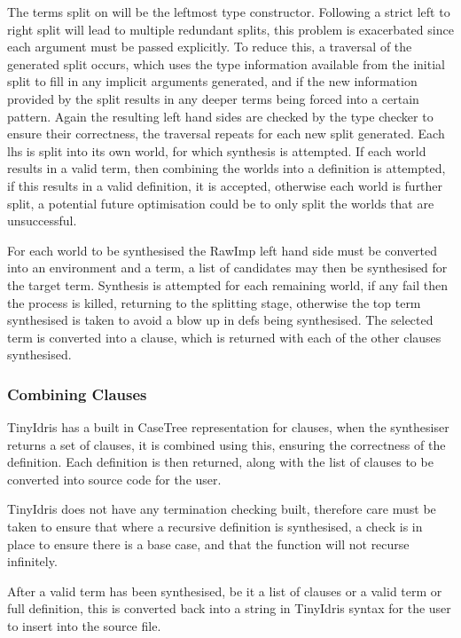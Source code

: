 \documentclass[a4paper]{article}
\begin{document}
The terms split on will be the leftmost type constructor. Following a strict 
left to right split will lead to multiple redundant splits, this problem is 
exacerbated since each argument must be passed explicitly. To reduce this, 
a traversal of the generated split occurs, which uses the type information 
available from the initial split to fill in any implicit arguments generated, 
and if the new information provided by the split results in any deeper terms 
being forced into a certain pattern. Again the resulting left hand sides are
checked by the type checker to ensure their correctness, the traversal repeats for
each new split generated. Each lhs is split
into its own world, for which synthesis is attempted. If each world results 
in a valid term, then combining the worlds into a definition is attempted, if this
results in a valid definition, it is accepted, otherwise each world is further
split, a potential future optimisation could be to only split the worlds that are 
unsuccessful.

For each world to be synthesised the RawImp left hand side must be 
converted into an environment and a term, a list of candidates may then be 
synthesised for the target term. Synthesis is attempted for each remaining world, 
if any fail then the process is killed, returning to the splitting stage, otherwise the top term synthesised
is taken to avoid a blow up in defs being synthesised. The selected term is
converted into a clause, which is returned with each of the other clauses synthesised. 

\subsubsection{Combining Clauses}
\label{sec:org909acde}
TinyIdris has a built in CaseTree representation for clauses, when the synthesiser
returns a set of clauses, it is combined using this, ensuring the correctness
of the definition. Each definition is then returned, along with the list of clauses
to be converted into source code for the user.

TinyIdris does not have any termination checking built, therefore care
must be taken to ensure that where a recursive definition is synthesised,
a check is in place to ensure there is a base case, and that the function
will not recurse infinitely. 

After a valid term has been synthesised, be it a list of clauses or a valid term or 
full definition, this is converted back into a string in TinyIdris syntax for
the user to insert into the source file. 
\end{document}
